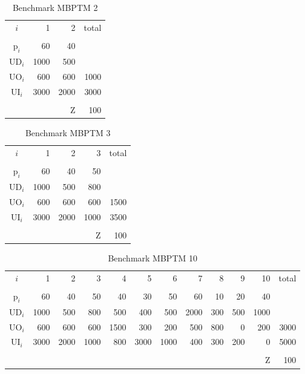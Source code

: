 \documentclass[authoryear,manuscript,12pt]{elsarticle}
\begin{document}
\begin{table}[h]
\begin{center}
\begin{tabular}[c]{c r r r}
$i$ & 1 & 2 & total \\
\cline {1-4} \\
$\textrm{p}_i$ & 60 & 40 & \\
$\textrm{UD}_i$ & 1000 & 500 & \\
$\textrm{UO}_i$ & 600 & 600 & 1000 \\
$\textrm{UI}_i$ & 3000 & 2000 & 3000 \\
\cline {1-4} \\
& & $\textrm{Z}$ & 100 \\
\end{tabular}
\caption{Benchmark MBPTM 2}
\label{tab:MBPTMP001}
\end{center}
\end{table}

\begin{table}[h]
\begin{center}
\begin{tabular}[c]{c r r r r}
$i$ & 1 & 2 & 3 & total \\
\cline {1-5} \\
$\textrm{p}_i$ & 60 & 40 & 50 \\
$\textrm{UD}_i$ & 1000 & 500 & 800 \\
$\textrm{UO}_i$ & 600 & 600 & 600 & 1500 \\
$\textrm{UI}_i$ & 3000 & 2000 & 1000 & 3500 \\
\cline {1-5} \\
& & & $\textrm{Z}$ & 100 \\
\end{tabular}
\caption{Benchmark MBPTM 3}
\label{tab:MBPTMP002}
\end{center}
\end{table}

\begin{table}[h]
\begin{center}
\begin{small}
\begin{tabular}[c]{c r r r r r r r r r r r }
$i$ & 1 & 2 & 3 & 4 & 5 & 6 & 7 & 8 & 9 & 10 & total \\
\cline {1-12} \\
$\textrm{p}_i$ & 60 & 40 & 50 & 40 & 30 & 50 & 60 & 10 & 20 & 40\\
$\textrm{UD}_i$ & 1000 & 500 & 800 & 500 & 400 & 500 & 2000 & 300 & 500 & 1000 \\
$\textrm{UO}_i$ & 600 & 600 & 600 & 1500 & 300 & 200 & 500 & 800 & 0 & 200 & 3000 \\
$\textrm{UI}_i$ & 3000 & 2000 & 1000 & 800 & 3000 & 1000 & 400 & 300 & 200 & 0 & 5000 \\
\cline {1-12} \\
& & & & & & & & & & $\textrm{Z}$ & 100 \\
\end{tabular}
\caption{Benchmark MBPTM 10}
\label{tab:MBPTMP003}
\end{small}
\end{center}
\end{table}
\end{document}

